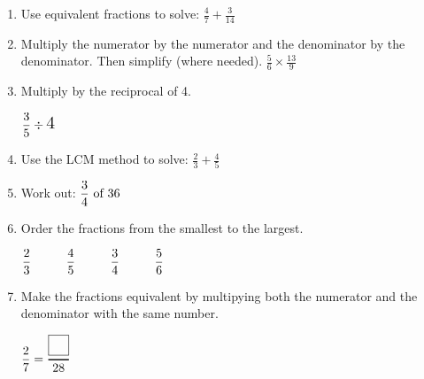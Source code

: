 \documentclass{article}
\begin{document}
\begin{enumerate}

\item \quad Use equivalent fractions to solve: $ \displaystyle \frac{4}{7} + \displaystyle \frac{3}{14} $ 
\vspace{8pt}

\item \quad Multiply the numerator by the numerator and the denominator by the denominator. 
Then simplify (where needed).
\( \displaystyle \frac{5}{6} \times \displaystyle \frac{13}{9} \) 
\vspace{8pt}

\item \quad Multiply by the reciprocal of 4. 

\( \displaystyle \frac{3}{5} \div \text{\Large 4} \) 
\vspace{8pt}

\item \quad Use the LCM method to solve: \( \displaystyle\frac{2}{3} + \displaystyle \frac{4}{5} \) 
\vspace{8pt}

\item \quad Work out: \( \displaystyle \frac{3}{4} \text{ of } \large 36 \)  
\vspace{8pt}

\item \quad Order the fractions from the smallest to the largest. 

\( \displaystyle \frac{2}{3} \hspace{1cm} \displaystyle \frac{4}{5} \hspace{1cm} \displaystyle \frac{3}{4}  \hspace{1cm} \displaystyle \frac{5}{6}  \vspace{8pt} \)

\item \quad Make the fractions equivalent by multipying both the numerator and the denominator with the same number. 

\( \displaystyle \frac{2}{7} =  \genfrac{}{}{1pt}{0}{\fbox{\makebox[1em]{\rule{0pt}{1em}}}}{28} \)
\vspace{5pt}


\end{enumerate}
\end{document}
